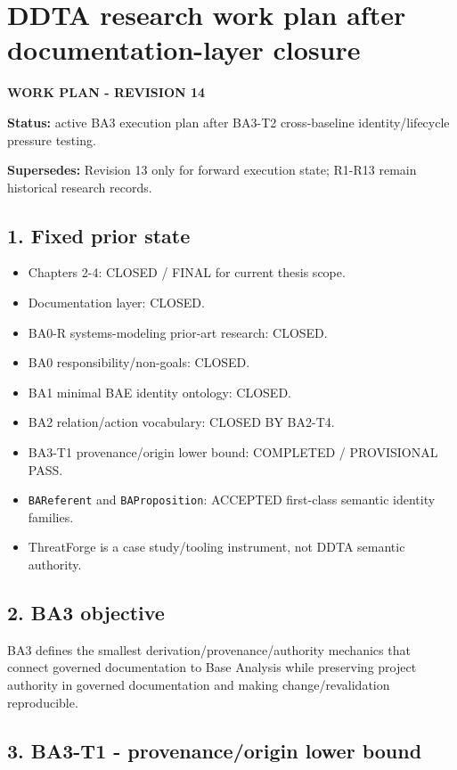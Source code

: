 \documentclass[11pt,a4paper]{article}
\providecommand{\tightlist}{\setlength{\itemsep}{0pt}\setlength{\parskip}{0pt}}\setlength{\emergencystretch}{4em}\hbadness=10000\hfuzz=20pt\sloppy
\begin{document}
\section{DDTA research work plan after documentation-layer
closure}\label{ddta-research-work-plan-after-documentation-layer-closure}

\textbf{WORK PLAN - REVISION 14}

\textbf{Status:} active BA3 execution plan after BA3-T2 cross-baseline
identity/lifecycle pressure testing.

\textbf{Supersedes:} Revision 13 only for forward execution state;
R1-R13 remain historical research records.

\subsection{1. Fixed prior state}\label{fixed-prior-state}

\begin{itemize}
\tightlist
\item
  Chapters 2-4: CLOSED / FINAL for current thesis scope.
\item
  Documentation layer: CLOSED.
\item
  BA0-R systems-modeling prior-art research: CLOSED.
\item
  BA0 responsibility/non-goals: CLOSED.
\item
  BA1 minimal BAE identity ontology: CLOSED.
\item
  BA2 relation/action vocabulary: CLOSED BY BA2-T4.
\item
  BA3-T1 provenance/origin lower bound: COMPLETED / PROVISIONAL PASS.
\item
  \texttt{BAReferent} and \texttt{BAProposition}: ACCEPTED first-class
  semantic identity families.
\item
  ThreatForge is a case study/tooling instrument, not DDTA semantic
  authority.
\end{itemize}

\subsection{2. BA3 objective}\label{ba3-objective}

BA3 defines the smallest derivation/provenance/authority mechanics that
connect governed documentation to Base Analysis while preserving project
authority in governed documentation and making change/revalidation
reproducible.

\subsection{3. BA3-T1 - provenance/origin lower
bound}\label{ba3-t1---provenanceorigin-lower-bound}
\end{document}
